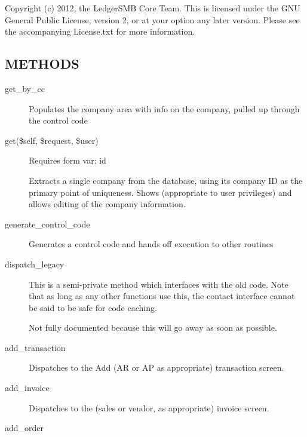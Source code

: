 \begin{description}
Copyright (c) 2012, the LedgerSMB Core Team.  This is licensed under the GNU 
General Public License, version 2, or at your option any later version.  Please 
see the accompanying License.txt for more information.

\subsection*{METHODS\label{LedgerSMB::Scripts::contact_METHODS}}
\begin{description}

\item[{get\_by\_cc}] \mbox{}

Populates the company area with info on the company, pulled up through the 
control code


\item[{get(\$self, \$request, \$user)}] \mbox{}

Requires form var: id



Extracts a single company from the database, using its company ID as the primary
point of uniqueness. Shows (appropriate to user privileges) and allows editing
of the company information.


\item[{generate\_control\_code}] \mbox{}

Generates a control code and hands off execution to other routines


\item[{dispatch\_legacy}] \mbox{}

This is a semi-private method which interfaces with the old code.  Note that
as long as any other functions use this, the contact interface cannot be said to 
be safe for code caching.



Not fully documented because this will go away as soon as possible.


\item[{add\_transaction}] \mbox{}

Dispatches to the Add (AR or AP as appropriate) transaction screen.


\item[{add\_invoice}] \mbox{}

Dispatches to the (sales or vendor, as appropriate) invoice screen.


\item[{add\_order}] \mbox{}


\end{description}
\end{description}
